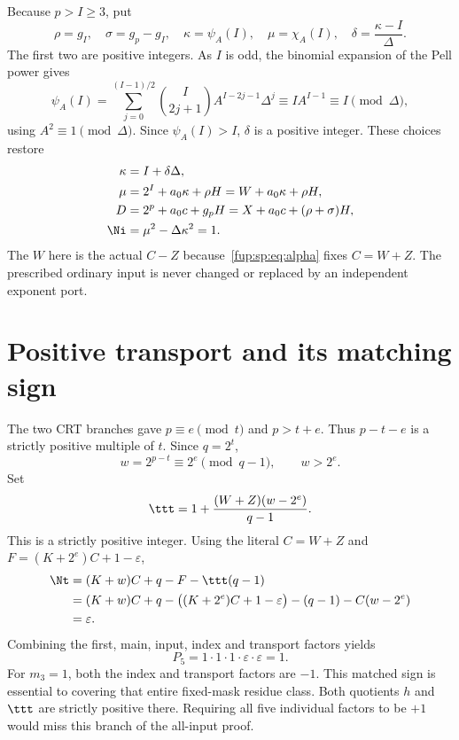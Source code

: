 \documentclass[11pt,letterpaper]{article}
\theoremstyle{definition}\newtheorem{definition}[theorem]{Definition}
\theoremstyle{remark}\newtheorem{remark}[theorem]{Remark}
\newcommand{\D}{\Delta}
\newcommand{\ch}[2]{\chi_{#1}(#2)}\newcommand{\ps}[2]{\psi_{#1}(#2)}
\begin{document}
Because $p>I\ge3$, put
\begin{equation}
\rho=g_I,\quad \sigma=g_p-g_I,\quad
\kappa=\ps A I,\quad\mu=\ch A I,\quad
\delta=\frac{\kappa-I}{\D}.
\label{fup:sp:eq:inputchoices}
\end{equation}
The first two are positive integers. As $I$ is odd, the binomial
expansion of the Pell power gives
\[
\ps A I=\sum_{j=0}^{(I-1)/2}
\binom I{2j+1}A^{I-2j-1}\D^j
\equiv IA^{I-1}\equiv I\pmod\D,
\]
using $A^2\equiv1\pmod\D$. Since $\ps A I>I$, $\delta$ is a
positive integer. These choices restore
\begin{align}
\kappa&=I+\delta\D,\\
\mu&=2^I+a_0\kappa+\rho H=W+a_0\kappa+\rho H,\\
D&=2^p+a_0c+g_pH=X+a_0c+(\rho+\sigma)H,\\
\Ni&=\mu^2-\D\kappa^2=1.
\label{fup:sp:eq:restoredinput}
\end{align}
The $W$ here is the actual $C-Z$ because~\eqref{fup:sp:eq:alpha} fixes
$C=W+Z$. The prescribed ordinary input is never changed or
replaced by an independent exponent port.

\section{Positive transport and its matching sign}
\label{fup:sp:sec:transport}
The two CRT branches gave $p\equiv e\pmod t$ and $p>t+e$.
Thus $p-t-e$ is a strictly positive multiple of $t$. Since $q=2^t$,
\[
w=2^{p-t}\equiv2^e\pmod{q-1},\qquad w>2^e.
\]
Set
\begin{equation}
\ttt=1+\frac{(W+Z)(w-2^e)}{q-1}.
\label{fup:sp:eq:ttr}
\end{equation}
This is a strictly positive integer. Using the literal $C=W+Z$ and
$F=(K+2^e)C+1-\varepsilon$,
\begin{align}
\Nt
&=(K+w)C+q-F-\ttt(q-1)\notag\\
&=(K+w)C+q-\bigl((K+2^e)C+1-\varepsilon\bigr)
 -(q-1)-C(w-2^e)\notag\\
&=\varepsilon.
\label{fup:sp:eq:transport-sign}
\end{align}
Combining the first, main, input, index and transport factors yields
\begin{equation}
P_5=1\cdot1\cdot1\cdot\varepsilon\cdot\varepsilon=1.
\label{fup:sp:eq:P5}
\end{equation}
For $m_3=1$, both the index and transport factors are $-1$.
This matched sign is essential to covering that entire fixed-mask
residue class. Both quotients $h$ and $\ttt$ are strictly positive
there. Requiring all five individual factors to be $+1$ would miss
this branch of the all-input proof.
\end{document}
